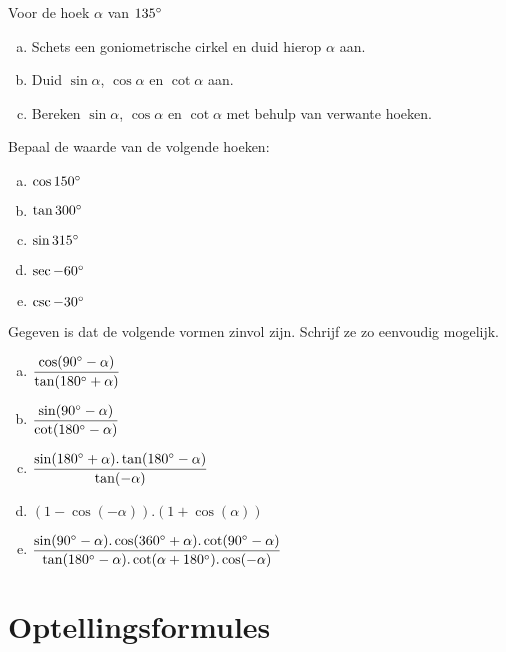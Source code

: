 \documentclass[a4paper,12pt]{article}
\begin{document}
\begin{oefening}
Voor de hoek $\alpha$ van $135^\circ$
\begin{enumerate}[(a)]
  \item Schets een goniometrische cirkel en duid hierop $\alpha$ aan.
  \item Duid $\sin \alpha$, $\cos \alpha$ en $\cot \alpha$ aan.
  \item Bereken $\sin \alpha$, $\cos \alpha$ en $\cot \alpha$ met behulp van verwante hoeken.
\end{enumerate}
\end{oefening}

\begin{oefening}
Bepaal de waarde van de volgende hoeken:
\begin{enumerate}[(a)]
  \itemsep.5em
  \item $\cos 150^\circ$
  \item $\tan 300^\circ$
  \item $\sin 315^\circ$
  \item $\sec -60^\circ$
  \item $\csc -30^\circ$
\end{enumerate}
\end{oefening}

\begin{oefening}
Gegeven is dat de volgende vormen zinvol zijn. Schrijf ze zo eenvoudig mogelijk.
\begin{enumerate}[(a)]
  \itemsep1em
  \item $\dfrac{\cos(90^\circ-\alpha)}{\tan(180^\circ+\alpha)}$
  \item $\dfrac{\sin(90^\circ-\alpha)}{\cot(180^\circ-\alpha)}$
  \item $\dfrac{\sin(180^\circ+\alpha).\tan(180^\circ-\alpha)}{\tan(-\alpha)}$
  \item $(1-\cos(-\alpha)).(1+\cos(\alpha))$
  \item $\dfrac{\sin(90^\circ-\alpha).\cos(360^\circ+\alpha).\cot(90^\circ-\alpha)}{\tan(180^\circ-\alpha).\cot(\alpha+180^\circ).\cos(-\alpha)}$
\end{enumerate}
\end{oefening}

\pagebreak
\section{Optellingsformules}
\end{document}

